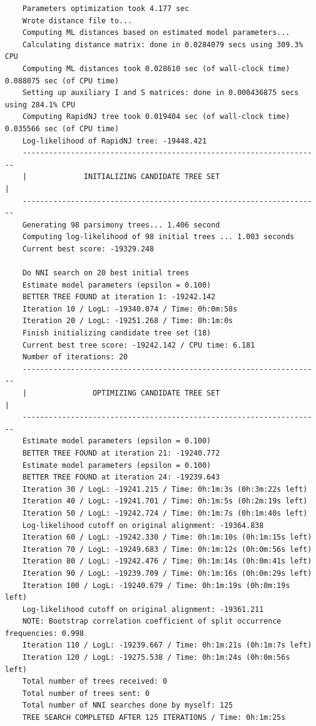 \documentclass{article}
\begin{document}
\begin{verbatim}
    Parameters optimization took 4.177 sec
    Wrote distance file to... 
    Computing ML distances based on estimated model parameters...
    Calculating distance matrix: done in 0.0284079 secs using 309.3% CPU
    Computing ML distances took 0.028610 sec (of wall-clock time) 0.088075 sec (of CPU time)
    Setting up auxiliary I and S matrices: done in 0.000436875 secs using 284.1% CPU
    Computing RapidNJ tree took 0.019404 sec (of wall-clock time) 0.035566 sec (of CPU time)
    Log-likelihood of RapidNJ tree: -19448.421
    --------------------------------------------------------------------
    |             INITIALIZING CANDIDATE TREE SET                      |
    --------------------------------------------------------------------
    Generating 98 parsimony trees... 1.406 second
    Computing log-likelihood of 98 initial trees ... 1.003 seconds
    Current best score: -19329.248
    
    Do NNI search on 20 best initial trees
    Estimate model parameters (epsilon = 0.100)
    BETTER TREE FOUND at iteration 1: -19242.142
    Iteration 10 / LogL: -19340.074 / Time: 0h:0m:58s
    Iteration 20 / LogL: -19251.268 / Time: 0h:1m:0s
    Finish initializing candidate tree set (18)
    Current best tree score: -19242.142 / CPU time: 6.181
    Number of iterations: 20
    --------------------------------------------------------------------
    |               OPTIMIZING CANDIDATE TREE SET                      |
    --------------------------------------------------------------------
    Estimate model parameters (epsilon = 0.100)
    BETTER TREE FOUND at iteration 21: -19240.772
    Estimate model parameters (epsilon = 0.100)
    BETTER TREE FOUND at iteration 24: -19239.643
    Iteration 30 / LogL: -19241.215 / Time: 0h:1m:3s (0h:3m:22s left)
    Iteration 40 / LogL: -19241.701 / Time: 0h:1m:5s (0h:2m:19s left)
    Iteration 50 / LogL: -19242.724 / Time: 0h:1m:7s (0h:1m:40s left)
    Log-likelihood cutoff on original alignment: -19364.838
    Iteration 60 / LogL: -19242.330 / Time: 0h:1m:10s (0h:1m:15s left)
    Iteration 70 / LogL: -19249.683 / Time: 0h:1m:12s (0h:0m:56s left)
    Iteration 80 / LogL: -19242.476 / Time: 0h:1m:14s (0h:0m:41s left)
    Iteration 90 / LogL: -19239.709 / Time: 0h:1m:16s (0h:0m:29s left)
    Iteration 100 / LogL: -19240.679 / Time: 0h:1m:19s (0h:0m:19s left)
    Log-likelihood cutoff on original alignment: -19361.211
    NOTE: Bootstrap correlation coefficient of split occurrence frequencies: 0.998
    Iteration 110 / LogL: -19239.667 / Time: 0h:1m:21s (0h:1m:7s left)
    Iteration 120 / LogL: -19275.538 / Time: 0h:1m:24s (0h:0m:56s left)
    Total number of trees received: 0
    Total number of trees sent: 0
    Total number of NNI searches done by myself: 125
    TREE SEARCH COMPLETED AFTER 125 ITERATIONS / Time: 0h:1m:25s
    

\end{verbatim}
\end{document}
